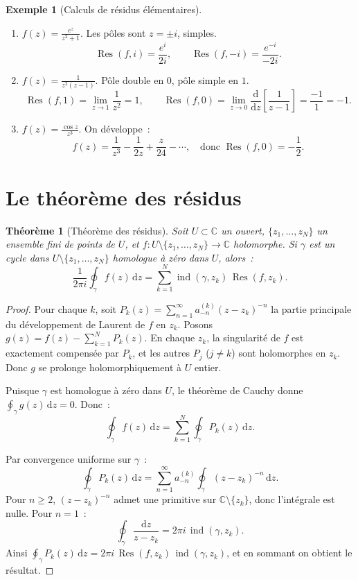 \documentclass[12pt,a4paper,openany]{book}
\theoremstyle{definition}
\newtheorem{exemple}[definition]{Exemple}
\theoremstyle{plain}
\newtheorem{theoreme}[definition]{Théorème}
\theoremstyle{remark}
\newcommand{\C}{\mathbb{C}}
\DeclareMathOperator{\Res}{Res}
\DeclareMathOperator{\ind}{ind}
\newcommand{\dd}{\mathrm{d}}
\begin{document}
\begin{exemple}[Calculs de résidus élémentaires]\label{ex:residus-elementaires}
\begin{enumerate}[label=\textbf{\arabic*.}]
  \item $f(z) = \frac{e^z}{z^2 + 1}$. Les pôles sont $z = \pm i$, simples.
  \[
    \Res(f, i) = \frac{e^i}{2i}, \qquad
    \Res(f, -i) = \frac{e^{-i}}{-2i}.
  \]

  \item $f(z) = \frac{1}{z^2(z-1)}$. Pôle double en $0$, pôle simple en $1$.
  \[
    \Res(f, 1) = \lim_{z \to 1} \frac{1}{z^2} = 1, \qquad
    \Res(f, 0) = \lim_{z \to 0} \frac{\dd}{\dd z}\!\left[\frac{1}{z-1}\right]
    = \frac{-1}{1} = -1.
  \]

  \item $f(z) = \frac{\cos z}{z^3}$. On développe~:
  \[
    f(z) = \frac{1}{z^3} - \frac{1}{2z} + \frac{z}{24} - \cdots,
    \quad \text{donc } \Res(f, 0) = -\frac{1}{2}.
  \]
\end{enumerate}
\end{exemple}

\section{Le théorème des résidus}\label{sec:thm-residus}

\begin{theoreme}[Théorème des résidus]\label{thm:residus}
Soit $U \subset \C$ un ouvert, $\{z_1, \ldots, z_N\}$ un ensemble fini de points
de $U$, et $f \colon U \setminus \{z_1, \ldots, z_N\} \to \C$ holomorphe.
Si $\gamma$ est un cycle dans $U \setminus \{z_1, \ldots, z_N\}$
homologue à zéro dans $U$, alors~:
\[
  \frac{1}{2\pi i} \oint_{\gamma} f(z)\, \dd z
  = \sum_{k=1}^{N} \ind(\gamma, z_k)\, \Res(f, z_k).
\]
\end{theoreme}

\begin{proof}
Pour chaque $k$, soit $P_k(z) = \sum_{n=1}^{\infty} a_{-n}^{(k)} (z - z_k)^{-n}$
la partie principale du développement de Laurent de $f$ en $z_k$.
Posons $g(z) = f(z) - \sum_{k=1}^{N} P_k(z)$. En chaque $z_k$, la singularité
de $f$ est exactement compensée par $P_k$, et les autres $P_j$ ($j \neq k$) sont
holomorphes en $z_k$. Donc $g$ se prolonge holomorphiquement à $U$ entier.

Puisque $\gamma$ est homologue à zéro dans $U$, le théorème de Cauchy donne
$\oint_{\gamma} g(z)\, \dd z = 0$. Donc~:
\[
  \oint_{\gamma} f(z)\, \dd z = \sum_{k=1}^{N} \oint_{\gamma} P_k(z)\, \dd z.
\]

Par convergence uniforme sur $\gamma$~:
\[
  \oint_{\gamma} P_k(z)\, \dd z
  = \sum_{n=1}^{\infty} a_{-n}^{(k)} \oint_{\gamma} (z - z_k)^{-n}\, \dd z.
\]
Pour $n \geq 2$, $(z - z_k)^{-n}$ admet une primitive sur $\C \setminus \{z_k\}$,
donc l'intégrale est nulle. Pour $n = 1$~:
\[
  \oint_{\gamma} \frac{\dd z}{z - z_k} = 2\pi i\, \ind(\gamma, z_k).
\]
Ainsi $\oint_{\gamma} P_k(z)\, \dd z = 2\pi i\, \Res(f, z_k)\, \ind(\gamma, z_k)$,
et en sommant on obtient le résultat.
\end{proof}
\end{document}
